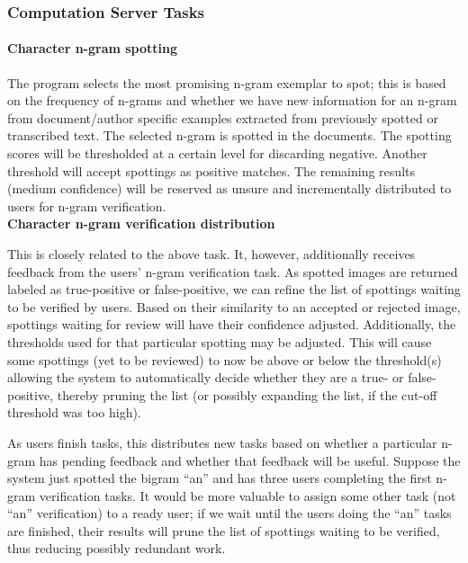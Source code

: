 \documentclass[ms]{byuprop}
\begin{document}
\subsubsection{Computation Server Tasks}

\paragraph{Character n-gram spotting}

The program selects the most promising n-gram exemplar to spot; this is based on the frequency of n-grams and whether we have new information for an n-gram from document/author specific examples extracted from previously spotted or transcribed text. The selected n-gram is spotted in the documents. The spotting scores will be thresholded at a certain level for discarding negative. Another threshold will accept spottings as positive matches. The remaining results (medium confidence) will be reserved as unsure and incrementally distributed to users for n-gram verification.
\\[.5cm]

\textbf{Character n-gram verification distribution}

\begin{addmargin}[3em]{3em}
This is closely related to the above task. It, however, additionally receives feedback from the users' n-gram verification task. As spotted images are returned labeled as true-positive or false-positive, we can refine the list of spottings waiting to be verified by users. Based on their similarity to an accepted or rejected image, spottings waiting for review will have their confidence adjusted. Additionally, the thresholds used for that particular spotting may be adjusted. This will cause some spottings (yet to be reviewed) to now be above or below the threshold(s) allowing the system to automatically decide whether they are a true- or false-positive, thereby pruning the list (or possibly expanding the list, if the cut-off threshold was too high).


\-\hspace{1cm} As users finish tasks, this distributes new tasks based on whether a particular n-gram has pending feedback and whether that feedback will be useful. Suppose the system just spotted the bigram ``an'' and has three users completing the first n-gram verification tasks. It would be more valuable to assign some other task (not ``an'' verification) to a ready user; if we wait until the users doing the ``an'' tasks are finished, their results will prune the list of spottings waiting to be verified, thus reducing possibly redundant work.
\\[.5cm]
\end{addmargin}
\end{document}
